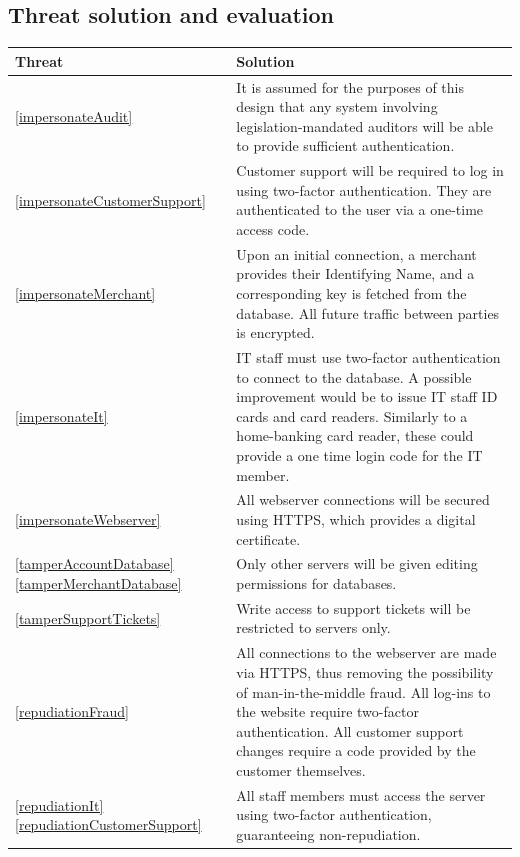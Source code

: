 \subsection{Threat solution and evaluation}

\begin{longtable}{|| p{} | p{} ||}
    \hline
    Threat & Solution \\
    \hline\hline

              \ref{impersonateAudit} & 
        It is assumed for the purposes of this design that any system involving legislation-mandated auditors will be able to provide sufficient authentication.
    \\ \hline \ref{impersonateCustomerSupport} & 
        Customer support will be required to log in using two-factor authentication. They are authenticated to the user via a one-time access code.
    \\ \hline \ref{impersonateMerchant} &
        Upon an initial connection, a merchant provides their Identifying Name, and a corresponding key is fetched from the database. All future traffic between parties is encrypted.
    \\ \hline \ref{impersonateIt} &
        IT staff must use two-factor authentication to connect to the database. A possible improvement would be to issue IT staff ID cards and card readers. Similarly to a home-banking card reader, these could provide a one time login code for the IT member.
    \\ \hline \ref{impersonateWebserver} &
        All webserver connections will be secured using HTTPS, which provides a digital certificate.
    \\ \hline \ref{tamperAccountDatabase} \ref{tamperMerchantDatabase} &
        Only other servers will be given editing permissions for databases.
    \\ \hline \ref{tamperSupportTickets} &
        Write access to support tickets will be restricted to servers only. 
    \\ \hline \ref{repudiationFraud} &
        All connections to the webserver are made via HTTPS, thus removing the possibility of man-in-the-middle fraud. All log-ins to the website require two-factor authentication. All customer support changes require a code provided by the customer themselves.
    \\ \hline \ref{repudiationIt} \ref{repudiationCustomerSupport} &
        All staff members must access the server using two-factor authentication, guaranteeing non-repudiation. 

\end{longtable}
